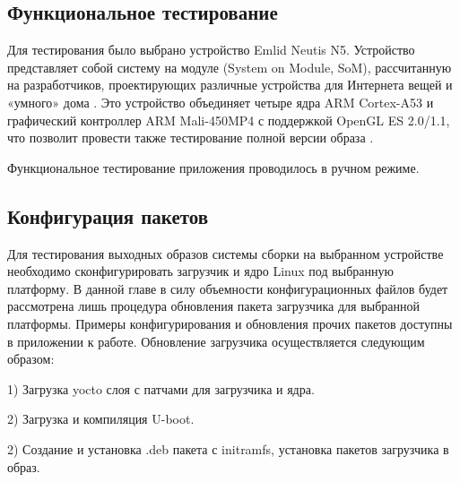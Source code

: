 \subsection{Функциональное тестирование}
Для тестирования было выбрано устройство Emlid Neutis N5.
Устройство представляет собой систему на модуле (System on Module, SoM), рассчитанную на разработчиков, проектирующих различные устройства для Интернета вещей и «умного» дома \cite{NEUTIS}.
Это устройство объединяет четыре ядра ARM Cortex-A53 и графический контроллер ARM Mali-450MP4 с поддержкой OpenGL ES 2.0/1.1, что позволит провести также тестирование полной версии образа \cite{NEUTIS}.

Функциональное тестирование приложения проводилось в ручном режиме.
\subsection{Конфигурация пакетов}
Для тестирования выходных образов системы сборки на выбранном устройстве необходимо сконфигурировать загрузчик и ядро Linux под выбранную платформу.
В данной главе в силу объемности конфигурационных файлов будет рассмотрена лишь процедура обновления пакета загрузчика для выбранной платформы.
Примеры конфигурирования и обновления прочих пакетов доступны в приложении к работе.
Обновление загрузчика осуществляется следующим образом:

1) Загрузка yocto слоя с патчами для загрузчика и ядра.



2) Загрузка и компиляция U-boot.





2) Создание и установка .deb пакета с initramfs, установка пакетов загрузчика в образ.






